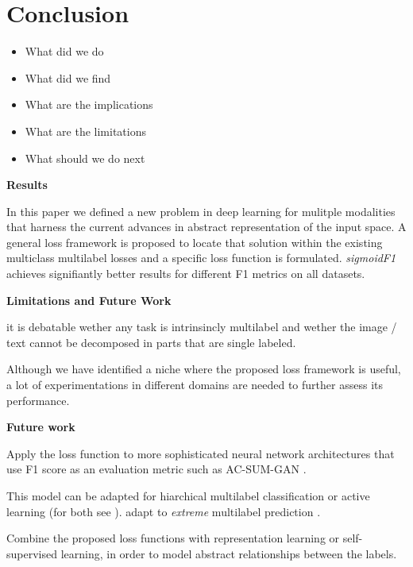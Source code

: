
\section{Conclusion}
\label{sec:orged3d8a1}
\begin{itemize}[leftmargin=*]
\item What did we do
\item What did we find
\item What are the implications
\item What are the limitations
\item What should we do next
\end{itemize}


\textbf{Results}

In this paper we defined a new problem in deep learning for mulitple modalities that harness the current advances in abstract representation of the input space. A general loss framework is proposed to locate that solution within the existing multiclass multilabel losses and a specific loss function is formulated. \emph{sigmoidF1} achieves signifiantly better results for different F1 metrics on all datasets.

\textbf{Limitations and Future Work}

it is debatable wether any task is intrinsincly multilabel and wether the image / text cannot be decomposed in parts that are single labeled.


Although we have identified a niche where the proposed loss framework is useful, a lot of experimentations in different domains are needed to further assess its performance.

\textbf{Future work}

Apply the loss function to more sophisticated neural network architectures that use F1 score as an evaluation metric such as AC-SUM-GAN \cite{AC-SUM-GAN}.

This model can be adapted for hiarchical multilabel classification \cite{HARAM} or active learning (for both see \cite{activeLearningMultiLabel}). adapt to \emph{extreme} multilabel prediction \cite{extremeMultilabelText, extremeSIGIR}.

Combine the proposed loss functions with representation learning \cite{unsupervisedImage,highResRepresentation} or self-supervised learning, in order to model abstract relationships between the labels.



